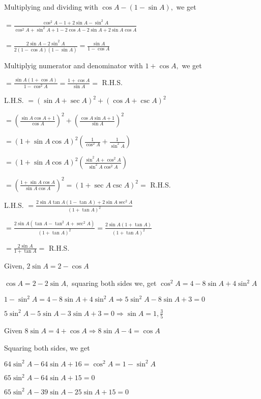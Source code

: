     Multiplying and dividing with $\cos A - (1 - \sin A),$ we get

    $= \frac{\cos^2A - 1 + 2\sin A - \sin^2A}{\cos^2A + \sin^2A + 1 - 2\cos A - 2\sin A + 2\sin A\cos A}$

    $= \frac{2\sin A - 2\sin^2A}{2(1 - \cos A)(1 - \sin A)} = \frac{\sin A}{1 - \cos A}$

    Multiplyig numerator and denominator with $1 + \cos A,$ we get

    $= \frac{\sin A(1 + \cos A)}{1 - \cos^2A} = \frac{1 + \cos A}{\sin A} =$ R.H.S.

\item L.H.S. $= (\sin A + \sec A)^2 + (\cos A + \csc A)^2$

    $= \left(\frac{\sin A\cos A + 1}{\cos A}\right)^2 + \left(\frac{\cos A\sin A + 1}{\sin A}\right)^2$

    $= (1 + \sin A\cos A)^2 \left(\frac{1}{\cos^2A} + \frac{1}{\sin^2A}\right)$

    $= (1 + \sin A\cos A)^2\left(\frac{\sin^2A + \cos^2A}{\sin^2A\cos^2A}\right)$

    $= \left(\frac{1 + \sin A\cos A}{\sin A\cos A}\right)^2 = (1 + \sec A\csc A)^2 =$ R.H.S.

\item L.H.S. $= \frac{2\sin A\tan A(1 - \tan A) + 2\sin A\sec^2A}{(1 + \tan A)^2}$

    $= \frac{2\sin A(\tan A - \tan^2A + \sec^2A)}{(1 + \tan A)^2} = \frac{2\sin A(1 + \tan A)}{(1 + \tan A)^2}$

    $= \frac{2\sin A}{1 + \tan A} =$ R.H.S.

\item Given, $2\sin A = 2 - \cos A$

    $\cos A = 2 - 2\sin A,$ squaring both sides we, get $\cos^2A = 4 - 8\sin A + 4\sin^2A$

    $1 - \sin^2A = 4 - 8\sin A + 4\sin^2A \Rightarrow 5\sin^2A - 8\sin A + 3 = 0$

    $5\sin^2A - 5\sin A - 3\sin A + 3 = 0 \Rightarrow \sin A = 1, \frac{3}{5}$

\item Given $8\sin A = 4 + \cos A \Rightarrow 8\sin A - 4 = \cos A$

    Squaring both sides, we get

    $64\sin^2A - 64\sin A + 16 = \cos^2A = 1 - \sin^2A$

    $65\sin^2A - 64\sin A + 15 = 0$

    $65\sin^2A - 39\sin A - 25\sin A + 15 = 0$

